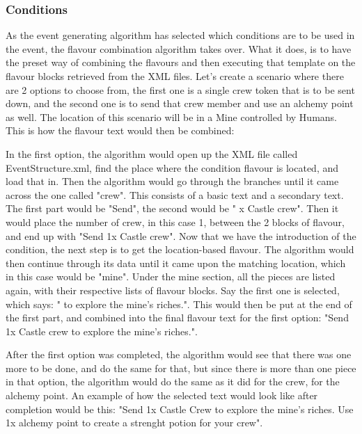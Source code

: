 \subsubsection{Conditions}
As the event generating algorithm has selected which conditions are to be used in the event, the flavour combination algorithm takes over. What it does, is to have the preset way of combining the flavours and then executing that template on the flavour blocks retrieved from the XML files. Let's create a scenario where there are 2 options to choose from, the first one is a single crew token that is to be sent down, and the second one is to send that crew member and use an alchemy point as well. The location of this scenario will be in a Mine controlled by Humans.
This is how the flavour text would then be combined:

In the first option, the algorithm would open up the XML file called EventStructure.xml, find the place where the condition flavour is located, and load that in. Then the algorithm would go through the branches until it came across the one called "crew". This consists of a basic text and a secondary text. The first part would be "Send", the second would be " x Castle crew". Then it would place the number of crew, in this case 1, between the 2 blocks of flavour, and end up with "Send 1x Castle crew".
Now that we have the introduction of the condition, the next step is to get the location-based flavour. The algorithm would then continue through its data until it came upon the matching location, which in this case would be "mine". Under the mine section, all the pieces are listed again, with their respective lists of flavour blocks. Say the first one is selected, which says: " to explore the mine's riches.". This would then be put at the end of the first part, and combined into the final flavour text for the first option: "Send 1x Castle crew to explore the mine's riches.".

After the first option was completed, the algorithm would see that there was one more to be done, and do the same for that, but since there is more than one piece in that option, the algorithm would do the same as it did for the crew, for the alchemy point.
An example of how the selected text would look like after completion would be this: "Send 1x Castle Crew to explore the mine's riches. Use 1x alchemy point to create a strenght potion for your crew".

